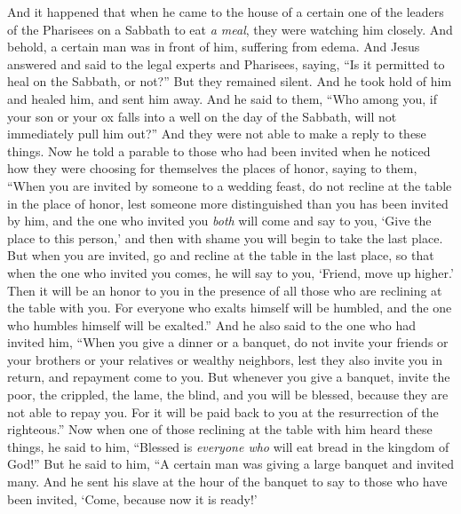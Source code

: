 \begin{biblechapter} %
 And it happened that when he came to the house of a certain one of the leaders of the Pharisees on a Sabbath to eat \textit{a meal}, they were watching him closely.
\verse And behold, a certain man was in front of him, suffering from edema.
\verse And Jesus answered and said to the legal experts and Pharisees, saying, “Is it permitted to heal on the Sabbath, or not?”
\verse But they remained silent. And he took hold of him and healed him, and sent him away.
\verse And he said to them, “Who among you, if your son or your ox falls into a well on the day of the Sabbath, will not immediately pull him out?”
\verse And they were not able to make a reply to these things.
 Now he told a parable to those who had been invited when he noticed how they were choosing for themselves the places of honor, saying to them,
\verse “When you are invited by someone to a wedding feast, do not recline at the table in the place of honor, lest someone more distinguished than you has been invited by him,
\verse and the one who invited you \textit{both} will come and say to you, ‘Give the place to this person,’ and then with shame you will begin to take the last place.
\verse But when you are invited, go and recline at the table in the last place, so that when the one who invited you comes, he will say to you, ‘Friend, move up higher.’ Then it will be an honor to you in the presence of all those who are reclining at the table with you.
\verse For everyone who exalts himself will be humbled, and the one who humbles himself will be exalted.”
 And he also said to the one who had invited him, “When you give a dinner or a banquet, do not invite your friends or your brothers or your relatives or wealthy neighbors, lest they also invite you in return, and repayment come to you.
\verse But whenever you give a banquet, invite the poor, the crippled, the lame, the blind,
\verse and you will be blessed, because they are not able to repay you. For it will be paid back to you at the resurrection of the righteous.”
\verse Now when one of those reclining at the table with him heard these things, he said to him, “Blessed is \textit{everyone who} will eat bread in the kingdom of God!”
\verse But he said to him, “A certain man was giving a large banquet and invited many.
\verse And he sent his slave at the hour of the banquet to say to those who have been invited, ‘Come, because now it is ready!’

\end{biblechapter}

